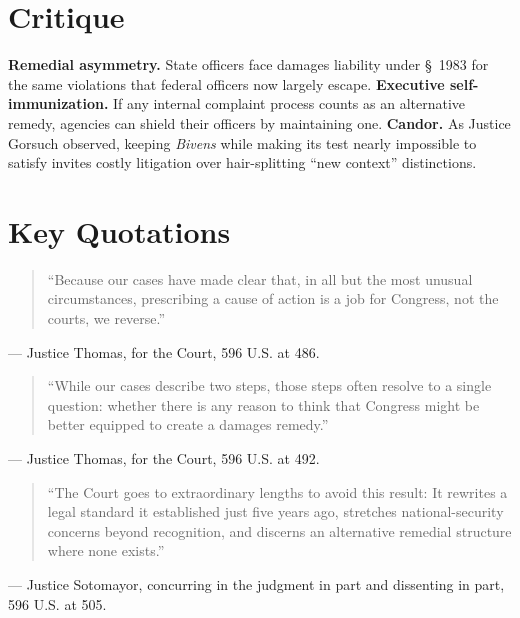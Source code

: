 \documentclass[12pt]{article}
\begin{document}
\section{Critique}

\textbf{Remedial asymmetry.} State officers face damages liability under \S~1983 for the same violations that federal officers now largely escape. \textbf{Executive self-immunization.} If any internal complaint process counts as an alternative remedy, agencies can shield their officers by maintaining one. \textbf{Candor.} As Justice Gorsuch observed, keeping \textit{Bivens} while making its test nearly impossible to satisfy invites costly litigation over hair-splitting ``new context'' distinctions.

\section{Key Quotations}

\begin{quote}
``Because our cases have made clear that, in all but the most unusual circumstances, prescribing a cause of action is a job for Congress, not the courts, we reverse.''
\end{quote}
\noindent --- Justice Thomas, for the Court, 596 U.S. at 486.

\begin{quote}
``While our cases describe two steps, those steps often resolve to a single question: whether there is any reason to think that Congress might be better equipped to create a damages remedy.''
\end{quote}
\noindent --- Justice Thomas, for the Court, 596 U.S. at 492.

\begin{quote}
``The Court goes to extraordinary lengths to avoid this result: It rewrites a legal standard it established just five years ago, stretches national-security concerns beyond recognition, and discerns an alternative remedial structure where none exists.''
\end{quote}
\noindent --- Justice Sotomayor, concurring in the judgment in part and dissenting in part, 596 U.S. at 505.
\end{document}
